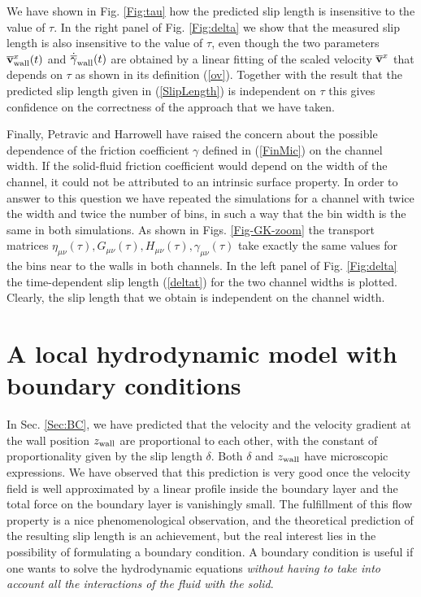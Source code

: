 \documentclass[b5paper,openright,10pt]{book}
\begin{document}
We have shown  in Fig. \ref{Fig:tau} how the predicted  slip length is
insensitive to the value of  $\tau$. In the right panel of Fig.  \ref{Fig:delta} we show
that the  measured slip  length is  also insensitive  to the  value of
$\tau$,  even though   the  two  parameters   $\overline{\bf  v}^x_{\rm
  wall}(t)$ and  $\dot{\overline{\gamma}}_{\rm wall}(t)$  are obtained
by a linear  fitting of the scaled velocity  $\overline{\bf v}^x$ that
depends on $\tau$ as shown in its definition (\ref{ov}). Together with
the result that the predicted  slip length given in (\ref{SlipLength})
is independent on  $\tau$ this gives confidence on  the correctness of
the approach that we have taken.

Finally,  Petravic and  Harrowell\cite{Petravic2007}  have raised  the
concern  about the  possible  dependence of  the friction  coefficient
$\gamma$  defined in  (\ref{FinMic})  on the  channel  width.  If  the
solid-fluid  friction coefficient  would depend  on the  width of  the
channel,  it  could   not  be  attributed  to   an  intrinsic  surface
property. In  order to answer  to this  question we have  repeated the
simulations for a channel with twice the width and twice the number of
bins,  in  such  a  way  that  the bin  width  is  the  same  in  both
simulations.   As  shown  in Figs.   \ref{Fig-GK-zoom}  the  transport
matrices
$\eta_{\mu\nu}(\tau),G_{\mu\nu}(\tau),H_{\mu\nu}(\tau),\gamma_{\mu\nu}(\tau)$
take exactly the  same values for the  bins near to the  walls in both
channels.   In the left panel of Fig.   \ref{Fig:delta} the  time-dependent slip  length
(\ref{deltat}) for  the two channel  widths is plotted.   Clearly, the
slip  length that  we  obtain  is independent  on  the channel  width.

\section{A local hydrodynamic model with boundary conditions}
\label{Sec:FinalCheck}
In  Sec. \ref{Sec:BC},  we have  predicted  that the  velocity and  the
velocity gradient at the wall position $z_{\rm wall}$ are proportional
to each other, with the constant  of proportionality given by the slip
length $\delta$.   Both $\delta$  and $z_{\rm wall}$  have microscopic
expressions.  We have observed that  this prediction is very good once
the velocity field is well approximated by a linear profile inside the
boundary  layer  and  the  total   force  on  the  boundary  layer  is
vanishingly small.   The fulfillment of  this flow property is  a nice
phenomenological observation,  and the  theoretical prediction  of the
resulting slip  length is  an achievement,  but the  real interest
lies  in  the  possibility  of formulating  a  boundary  condition.  A
boundary condition  is useful if  one wants to solve  the hydrodynamic
equations  \textit{without  having  to   take  into  account  all  the
  interactions of the fluid with the solid}.
\end{document}
